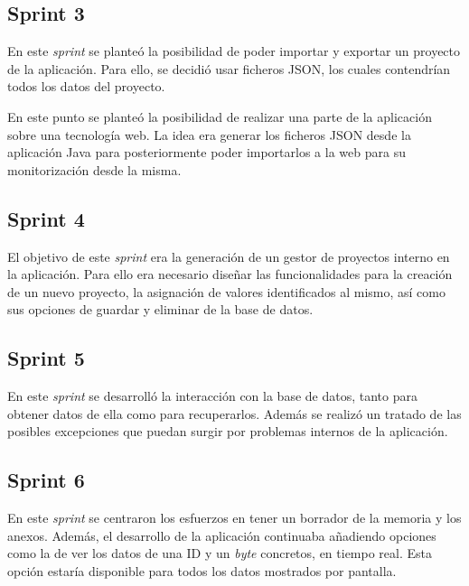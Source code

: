\subsection{Sprint 3}

En este \emph{sprint} se planteó la posibilidad de poder importar y exportar un proyecto de la aplicación. Para ello, se decidió usar ficheros JSON, los cuales contendrían todos los datos del proyecto.

En este punto se planteó la posibilidad de realizar una parte de la aplicación sobre una tecnología web. La idea era generar los ficheros JSON desde la aplicación Java para posteriormente poder importarlos a la web para su monitorización desde la misma.


\subsection{Sprint 4}

El objetivo de este \emph{sprint} era la generación de un gestor de proyectos interno en la aplicación. Para ello era necesario diseñar las funcionalidades para la creación de un nuevo proyecto, la asignación de valores identificados al mismo, así como sus opciones de guardar y eliminar de la base de datos.


\subsection{Sprint 5}

En este \emph{sprint} se desarrolló la interacción con la base de datos, tanto para obtener datos de ella como para recuperarlos. Además se realizó un tratado de las posibles excepciones que puedan surgir por problemas internos de la aplicación.


\subsection{Sprint 6}

En este \emph{sprint} se centraron los esfuerzos en tener un borrador de la memoria y los anexos. Además, el desarrollo de la aplicación continuaba añadiendo opciones como la de ver los datos de una ID y un \emph{byte} concretos, en tiempo real. Esta opción estaría disponible para todos los datos mostrados por pantalla.

